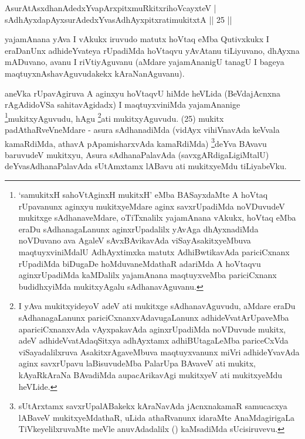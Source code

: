 \begin{shl}
AsurAtAsxdhanAdedxYvapArxpitxmuRkitxrihoVcayxteV |\\
sAdhAyxdapAyxsurAdedxYvasAdhAyxpitxratimukitxtA \hfill || 25 ||
\end{shl}

\begin{artha}
yajamAnana yAva I vAkukx iruvudo matutx hoVtaq eMba Qutivxkukx I eraDanUnx adhideYvateya rUpadiMda hoVtaqvu yAvAtanu tiLiyuvano, dhAyxna mADuvano, avanu I riVtiyAguvanu (aMdare yajamAnanigU tanagU I bageya maqtuyxnAshavAguvudakekx kAraNanAguvanu).
\end{artha}

\begin{artha}
aneVka rUpavAgiruva A aginxyu hoVtaqvU hiMde heVLida (BeVdajAcnxna rAgAdidoVSa sahitavAgidadx) I maqtuyxviniMda yajamAnanige \footnote[1]{`samukitxH sahoVtA\s ginxH mukitxH' eMba BASayxdaMte A hoVtaq rUpavanunx aginxyu mukitxyeMdare aginx savxrUpadiMda noVDuvudeV mukitxge sAdhanaveMdare, oTiTxnalilx yajamAnana vAkukx, hoVtaq eMba eraDu sAdhanagaLanunx aginxrUpadalilx yAvAga dhAyxnadiMda noVDuvano ava AgaleV sAvxBAvikavAda viSayAsakitxyeMbuva maqtuyxviniMdalU AdhAyxtimxka matutx AdhiBwtikavAda pariciCxnanx rUpadiMda biDugaDe hoMduvaneMdathaR adariMda A hoVtaqvu aginxrUpadiMda kaMDalilx yajamAnana maqtuyxveMba pariciCxnanx budidhxyiMda mukitxyAgalu sAdhanavAguvanu.}mukitxyAgu\-vudu, hAgu \footnote[2]{I yAva mukitxyideyoV adeV ati mukitxge sAdhanavAguvudu, aMdare eraDu sAdhanagaLanunx pariciCxnanxvAdavugaLanunx adhideVvatArUpaveMba apariciCxnanxvAda vAyxpakavAda aginxrUpadiMda noVDuvude mukitx, adeV adhideVvatAdaqSitxya adhAyxtamx adhiBUtagaLeMba pariceCxVda viSayadalilxruva AsakitxrAgaveMbuva maqtuyxvanunx miVri adhideYvavAda aginx savxrUpavu laBisuvudeMba PalarUpa BAvaveV ati mukitx, kAyaRkAraNa BAvadiMda aupacArikavAgi mukitxyeV ati mukitxyeMdu heVLide.}ati mukitxyAguvudu. (25) mukitx padAthaRveVneMdare - asura sAdhanadiMda (vidAyx vihiVnavAda keVvala kamaRdiMda, athavA pApamisharxvAda kamaRdiMda) \footnote[1]{sUtArxtamx savxrUpalABakekx kAraNavAda jAcnxnakamaR samucacxya lABaveV mukitxyeMdathaR, uLida athaRvanunx idaraMte AnaMdagirigaLa TiVkeyelilxruvaMte meVle anuvAdadalilx (\quad) kaMsadiMda sUcisiruvevu.}deYva BAvavu baruvudeV mukitxyu, Asura sAdhanaPalavAda (savxgARdigaLigiMtalU) deYvasAdhanaPalavAda sUtAmxtamx lABavu ati mukitxyeMdu tiLiyabeVku.
\end{artha}


